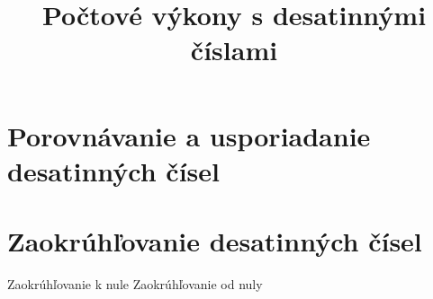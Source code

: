 \documentclass{article}
\title{Počtové výkony s desatinnými číslami}
\begin{document}
\maketitle

\section{Porovnávanie a usporiadanie desatinných čísel}

\section{Zaokrúhľovanie desatinných čísel}

Zaokrúhľovanie k nule
Zaokrúhľovanie od nuly
\end{document}
